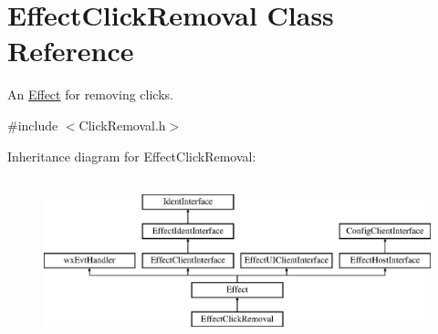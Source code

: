\hypertarget{class_effect_click_removal}{}\section{Effect\+Click\+Removal Class Reference}
\label{class_effect_click_removal}


An \hyperlink{class_effect}{Effect} for removing clicks.  




{\ttfamily \#include $<$Click\+Removal.\+h$>$}

Inheritance diagram for Effect\+Click\+Removal\+:\begin{figure}[H]
\begin{center}
\leavevmode
\includegraphics[height=4.794520cm]{class_effect_click_removal}
\end{center}
\end{figure}
